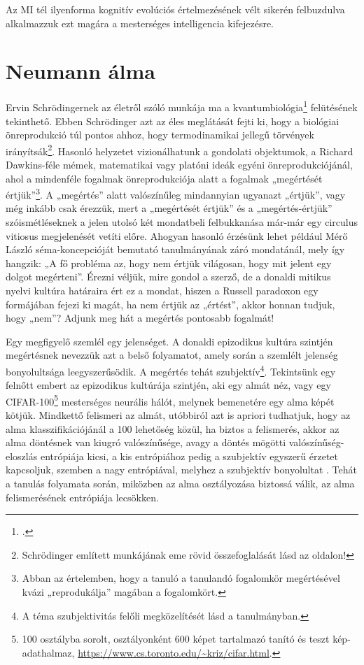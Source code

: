\documentclass[a4paper]{article}
\begin{document}
Az MI tél ilyenforma kognitív evolúciós értelmezésének vélt sikerén felbuzdulva alkalmazzuk ezt magára a mesterséges intelligencia kifejezésre.

\section{Neumann álma}

Ervin Schrödingernek az életről szóló \cite{Schrodinger70} munkája ma a kvantumbiológia\footnote{\cite{QUANTUMB}.} felütésének tekinthető. Ebben Schrödinger azt az éles meglátását fejti ki, hogy a biológiai önreprodukció túl pontos ahhoz, hogy termodinamikai jellegű törvények irányítsák\footnote{Schrödinger említett munkájának eme rövid összefoglalását lásd az \cite[76]{QUANTUMB} oldalon!}. Hasonló helyzetet vizionálhatunk a gondolati objektumok, a Richard Dawkins-féle mémek, matematikai vagy platóni ideák egyéni önreprodukciójánál, ahol a mindenféle fogalmak önreprodukciója alatt a fogalmak „megértését értjük”\footnote{Abban az értelemben, hogy a tanuló a tanulandó fogalomkör megértésével kvázi „reprodukálja” magában a fogalomkört.}. A „megértés” alatt valószínűleg mindannyian ugyanazt „értjük”, vagy még inkább csak érezzük, mert a „megértését értjük” és a „megértés-értjük” szóismétléseknek a jelen utolsó két mondatbeli felbukkanása már-már egy circulus vitiosus megjelenését vetíti előre. Ahogyan hasonló érzésünk lehet például Mérő László séma-koncepcióját bemutató \cite[45]{Mero89} tanulmányának záró mondatánál, mely így hangzik: „A fő probléma az, hogy nem értjük világosan, hogy mit jelent egy dolgot megérteni”. Érezni véljük, mire gondol a szerző, de a donaldi mitikus nyelvi kultúra határaira ért ez a mondat, hiszen a Russell paradoxon egy formájában fejezi ki magát, ha nem értjük az „értést”, akkor honnan tudjuk, hogy „nem”? Adjunk meg hát a megértés pontosabb fogalmát!

Egy megfigyelő szemlél egy jelenséget. A donaldi epizodikus kultúra szintjén megértésnek nevezzük azt a belső folyamatot, amely során a szemlélt jelenség bonyolultsága leegyszerűsödik. A megértés tehát szubjektív\footnote{A téma szubjektivitás felőli megközelítését lásd a \cite{BN18} tanulmányban.}. Tekintsünk egy felnőtt embert az epizodikus kultúrája szintjén, aki egy almát néz, vagy egy CIFAR-100\footnote{100 osztályba sorolt, osztályonként 600 képet tartalmazó tanító és teszt kép-adathalmaz, \url{https://www.cs.toronto.edu/~kriz/cifar.html}.} mesterséges neurális hálót, melynek bemenetére egy alma képét kötjük. Mindkettő felismeri az almát, utóbbiról azt is apriori tudhatjuk, hogy az alma klasszifikációjánál a 100 lehetőség közül, ha biztos a felismerés, akkor az alma döntésnek van kiugró valószínűsége, avagy a döntés mögötti valószínűség-eloszlás entrópiája kicsi, a kis entrópiához pedig a szubjektív egyszerű érzetet kapcsoljuk, szemben a nagy entrópiával, melyhez a szubjektív bonyolultat \cite{BN18}. Tehát a tanulás folyamata során, miközben az alma osztályozása biztossá válik, az alma felismerésének entrópiája lecsökken.
\end{document}
